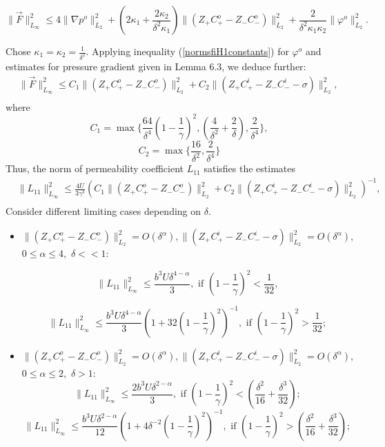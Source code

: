 \documentclass{amsart}
\begin{document}
$$\|\overrightarrow{F}\|^2_{L_\infty}\leq 4\|\nabla p^o\|^2_{L_2}+\left(2\kappa_1+\frac{2\kappa_2}{\delta^2\kappa_1}\right)\|\left(Z_{+}C^o_{+}-Z_{-}C^o_{-}\right)\|_{L_2}^2+\frac{2}{\delta^2\kappa_1\kappa_2}\|\varphi^o\|^2_{L_2}.$$

Chose $\kappa_1=\kappa_2=\frac{1}{\delta^2}.$ Applying inequality (\ref{normsfiH1constants}) for $\varphi^o$ and estimates for pressure gradient given in Lemma 6.3,  we deduce further:
\begin{equation}\label{norma F}
\begin{aligned}
&\|\overrightarrow{F}\|^2_{L_\infty}\leq C_1\|\left(Z_{+}C^o_{+}-Z_{-}C^o_{-}\right)\|_{L_2}^2+C_2\|\left(Z_{+}C^i_{+}-Z_{-}C^i_{-}-\sigma\right)\|_{L_2}^2,\quad \\
\end{aligned}
\end{equation}
 where
 $$C_1=\max\{\frac{64}{\delta^4}\left(1-\frac{1}{\gamma}\right)^2, \left(\frac{4}{\delta^2}+\frac{2}{\delta}\right), \frac{2}{\delta^4} \},$$
$$C_2=\max\{\frac{16}{\delta^2}, \frac{2}{\delta^4} \} $$
Thus, the norm of permeability coefficient $L_{11}$ satisfies the estimates
\begin{equation}\label{norma L11}
\begin{aligned}
&\|L_{11}\|^2_{L_\infty}\leq \frac{4U}{3\gamma^3}\left(C_1\|\left(Z_{+}C^o_{+}-Z_{-}C^o_{-}\right)\|_{L_2}^2+C_2\|\left(Z_{+}C^i_{+}-Z_{-}C^i_{-}-\sigma\right)\|_{L_2}^2\right)^{-1},\quad \\
\end{aligned}
\end{equation}
Consider different limiting cases depending on $\delta.$

\begin{itemize}
\item $\|\left(Z_{+}C^o_{+}-Z_{-}C^o_{-}\right)\|_{L_2}^2=O(\delta^\alpha),\|\left(Z_{+}C^i_{+}-Z_{-}C^i_{-}-\sigma\right)\|_{L_2}^2=O(\delta^\alpha),$ \\ ${ 0\leq \alpha\leq 4}, $ $\delta<<1:$

$$\|L_{11}\|^2_{L_\infty}\leq \frac{b^3U\delta^{4-\alpha}}{3},  \text{  if }\left(1-\frac{1}{\gamma}\right)^2<\frac{1}{32} ,$$

$$\|L_{11}\|^2_{L_\infty}\leq \frac{b^3U\delta^{4-\alpha}}{3}\left(1+32\left(1-\frac{1}{\gamma}\right)^2\right)^{-1},  \text{  if }\left(1-\frac{1}{\gamma}\right)^2>\frac{1}{32};$$

\item $\|\left(Z_{+}C^o_{+}-Z_{-}C^o_{-}\right)\|_{L_2}^2=O(\delta^\alpha),\|\left(Z_{+}C^i_{+}-Z_{-}C^i_{-}-\sigma\right)\|_{L_2}^2=O(\delta^\alpha),$ \\ ${ 0\leq \alpha\leq 2}, $ $\delta>1:$
$$\|L_{11}\|^2_{L_\infty}\leq \frac{2b^3U\delta^{2-\alpha}}{3},  \text{  if }\left(1-\frac{1}{\gamma}\right)^2<\left(\frac{\delta^2}{16}+\frac{\delta^3}{32}\right);$$
$$\|L_{11}\|^2_{L_\infty}\leq \frac{b^3U\delta^{2-\alpha}}{12}\left(1+4\delta^{-2}\left(1-\frac{1}{\gamma}\right)^2\right)^{-1},  \text{  if }\left(1-\frac{1}{\gamma}\right)^2>\left(\frac{\delta^2}{16}+\frac{\delta^3}{32}\right);$$


\end{itemize}
\end{document}
